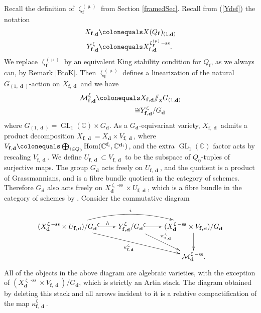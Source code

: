 \documentclass[a4paper,10pt]{amsart}
\renewcommand{\zeta}{\upzeta}
\renewcommand{\pi}{\uppi\hspace{0.05em}}
\renewcommand{\chi}{\upchi}
\renewcommand{\mu}{\upmu}
\newcommand{\ff}{\mathbf{f}}
\newcommand{\Msp}{\mathcal{M}}
\DeclareMathOperator{\sst}{-ss}
\DeclareMathOperator{\Hom}{Hom}
\DeclareMathOperator{\dd}{\mathbf{d}}
\DeclareMathOperator{\Gl}{GL}
\begin{document}
Recall the definition of $\zeta_{\ff}^{(\mu)}$ from Section \ref{framedSec}.  Recall from (\ref{Ydef}) the notation
\begin{align*}
X_{\ff,\dd}\colonequals &X(Q_{\ff})_{(1,\dd)}\\
Y_{\ff,\dd}^{\zeta}\colonequals &X_{\ff,\dd}^{\zeta_{\ff}^{(\mu)}\sst}.
\end{align*}
We replace $\zeta_{\ff}^{(\mu)}$ by an equivalent King stability condition for $Q_{\ff}$, as we always can, by Remark \ref{BtoK}.  Then $\zeta_{\ff}^{(\mu)}$ defines a linearization of the natural $G_{(1,\dd)}$-action on $X_{\ff,\dd}$ and we have 
\begin{align*}
\Msp_{\ff,\dd}^{\zeta}\colonequals &X_{\ff,\dd}/\!\!/_{\chi}G_{(1,\dd)}
\\\cong &Y_{\ff,\dd}^{\zeta}/G_{\dd}
\end{align*}
where $G_{(1,\dd)}=\Gl_1(\mathbb{C})\times G_{\dd}$.  As a $G_{\dd}$-equivariant variety, $X_{\ff,\dd}$ admits a product decomposition $X_{\ff,\dd}=X_{\dd}\times V_{\ff,\dd}$, where $V_{\ff,\dd}\colonequals \bigoplus_{i\in Q_0}\Hom(\mathbb{C}^{\ff_i},\mathbb{C}^{\dd_i})$, and the extra $\Gl_1(\mathbb{C})$ factor acts by rescaling $V_{\ff,\dd}$.  We define $U_{\ff,\dd}\subset V_{\ff,\dd}$ to be the subspace of $Q_0$-tuples of surjective maps.  The group $G_{\dd}$ acts freely on $U_{\ff,\dd}$, and the quotient is a product of Grassmannians, and is a fibre bundle quotient in the category of schemes.  Therefore $G_{\dd}$ also acts freely on $X_{\dd}^{\zeta\sst}\times U_{\ff,\dd}$, which is a fibre bundle in the category of schemes by \cite[Prop.23]{EdGr98}.  Consider the commutative diagram
\[
\xymatrix{
(X_{\dd}^{\zeta\sst}\times U_{\ff,\dd})/G_{\dd}\ar@/^1.5pc/[rr]^-{i}\ar[drr]_{\kappa_{\ff,\dd}^{\zeta}}\ar@{^(->}[r]^-h& Y_{\ff,\dd}^{\zeta}/G_{\dd}\ar@{^(->}[r]\ar[rd]^{\pi ^{\zeta}_{\ff,\dd}}& (X_{\dd}^{\zeta\sst}\times V_{\ff,\dd})/G_{\dd}\ar[d]
\\&& \Msp_{\dd}^{\zeta\sst}.
}    
\]
All of the objects in the above diagram are algebraic varieties, with the exception of $(X_{\dd}^{\zeta\sst}\times V_{\ff,\dd})/G_{\dd}$, which is strictly an Artin stack.  The diagram obtained by deleting this stack and all arrows incident to it is a relative compactification of the map $\kappa_{\ff,\dd}^{\zeta}$.
\end{document}
